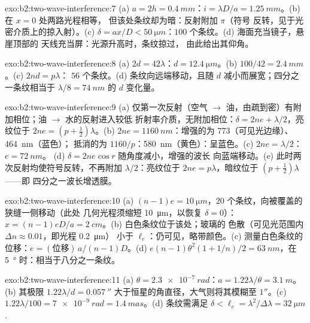 \begin{solution}{exo:b2:two-wave-interference:7}
(a) $a = 2h = \qty{0.4}{mm}$：$i = \lambda D/a = \qty{1.25}{mm}$。(b) 在 $x = 0$ 处两路光程相等，
但该处条纹却为暗：反射附加 $\pi$（符号
反转，见于光密介质上的掠入射）。(c) $\delta = ax/D <
\qty{50}{\micro m}$：$100$ 个条纹。(d) 海面充当镜子，悬崖顶部的
天线充当屏：光源升高时，条纹掠过，
由此给出其仰角。
\end{solution}

\begin{solution}{exo:b2:two-wave-interference:8}
(a) $2d = 42\lambda$：$d = \qty{12.4}{\micro m}$。(b) $100/42 = \qty{2.4}{mm}$。(c) $2nd = p\lambda$：
$56$ 个条纹。(d) 条纹向远端移动，且随 $d$
减小而展宽；四分之一条纹相当于 $\lambda/8 = \qty{74}{nm}$ 的 $d$ 变化量。
\end{solution}

\begin{solution}{exo:b2:two-wave-interference:9}
(a) 仅第一次反射（空气 $\to$ 油，由疏到密）有附加相位；油 $\to$ 水的反射进入较低
折射率介质，无附加相位：$\delta = 2ne + \lambda/2$，亮纹位于 $2ne = (p + \tfrac12)\lambda$。(b) $2ne =
\qty{1160}{nm}$：增强的为 $773$（可见光边缘）、\qty{464}{nm}（蓝色）；
抵消的为 $1160/p$：\qty{580}{nm}（黄色）：呈蓝色。(c) $2ne = \lambda/2$：$e = \qty{72}{nm}$。
(d) $\delta = 2ne\cos r$ 随角度减小，增强的波长
向蓝端移动。(e) 此时两次反射均使符号反转，不再附加
$\lambda/2$：亮纹位于 $2ne = p\lambda$，暗纹位于 $(p + \tfrac12)\lambda$——即
四分之一波长增透膜。
\end{solution}

\begin{solution}{exo:b2:two-wave-interference:10}
(a) $(n - 1)e = \qty{10}{\micro m}$，$20$ 个条纹，向被覆盖的狭缝一侧移动（此处
几何光程须缩短 \qty{10}{\micro m}，以恢复 $\delta = 0$）：
$x = (n - 1)eD/a = \qty{2}{cm}$。(b) 白色条纹位于该处；玻璃的
色散（可见光范围内 $\Delta n \approx 0.01$，即光程 \qty{0.2}{\micro m}）
小于 $\ell_c$：仍可见，略带颜色。(c) 测量白色条纹的
位移：$e = (\text{位移})\,a/(n - 1)D$。(d) $e(n - 1)\theta^2
(1 + 1/n)/2 = \qty{63}{nm}$，在 \qty{5}{\degree} 时：相当于八分之一条纹。
\end{solution}

\begin{solution}{exo:b2:two-wave-interference:11}
(a) $\theta = \qty{2.3e-7}{rad}$：$a = 1.22\lambda/\theta = \qty{3.1}{m}$。(b) 其极限 $1.22\lambda/d =
\qty{0.057}{''}$ 大于恒星的角直径，大气则将其模糊至
$1''$。(c) $1.22\lambda/100 = \qty{7e-9}{rad} = \qty{1.4}{mas}$。(d) 条纹需满足
$\delta < \ell_c = \lambda^2/\Delta\lambda = \qty{32}{\micro m}$.
\end{solution}

